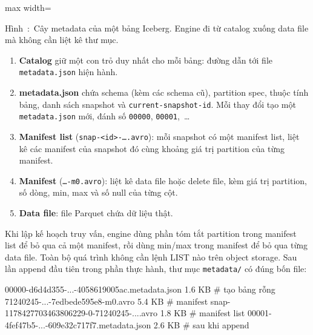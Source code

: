 \documentclass[12pt]{article}
\newcounter{hinh}
\newcommand{\capfig}[1]{%
  \refstepcounter{hinh}%
    Hình~\thehinh:~#1
}
\newenvironment{figblock}{\par\medskip\noindent\begin{minipage}{\linewidth}}{\end{minipage}\par\medskip}
\newcommand{\figcap}[2]{%
  \begin{figurecaptionmodern}\capfig{#1}\label{#2}\end{figurecaptionmodern}}
\begin{document}
\begin{figblock}
\begin{center}
\begin{adjustbox}{max width=\linewidth}
\end{adjustbox}
\end{center}
\figcap{Cây metadata của một bảng Iceberg. Engine đi từ catalog xuống data file mà không cần liệt kê thư mục.}{fig:iceberg}
\end{figblock}

\begin{enumerate}
    \item \textbf{Catalog} giữ một con trỏ duy nhất cho mỗi bảng: đường dẫn tới file \texttt{metadata.json} hiện hành.
    \item \textbf{metadata.json} chứa schema (kèm các schema cũ), partition spec, thuộc tính bảng, danh sách snapshot và \texttt{current-snapshot-id}. Mỗi thay đổi tạo một \texttt{metadata.json} mới, đánh số \texttt{00000}, \texttt{00001},~\dots
    \item \textbf{Manifest list} (\texttt{snap-<id>-\dots.avro}): mỗi snapshot có một manifest list, liệt kê các manifest của snapshot đó cùng khoảng giá trị partition của từng manifest.
    \item \textbf{Manifest} (\texttt{\dots-m0.avro}): liệt kê data file hoặc delete file, kèm giá trị partition, số dòng, min, max và số null của từng cột.
    \item \textbf{Data file}: file Parquet chứa dữ liệu thật.
\end{enumerate}

Khi lập kế hoạch truy vấn, engine dùng phần tóm tắt partition trong manifest list để bỏ qua cả một manifest, rồi dùng min/max trong manifest để bỏ qua từng data file. Toàn bộ quá trình không cần lệnh LIST nào trên object storage. Sau lần append đầu tiên trong phần thực hành, thư mục \texttt{metadata/} có đúng bốn file:

\begin{aivnCodeOutput}
\begin{python}
00000-d6d4d355-...-4058619005ac.metadata.json      1.6 KB   # tạo bảng rỗng
71240245-...-7edbede595e8-m0.avro                  5.4 KB   # manifest
snap-1178427703463806229-0-71240245-....avro       1.8 KB   # manifest list
00001-4fef47b5-...-609e32c717f7.metadata.json      2.6 KB   # sau khi append
\end{python}
\end{aivnCodeOutput}
\end{document}
